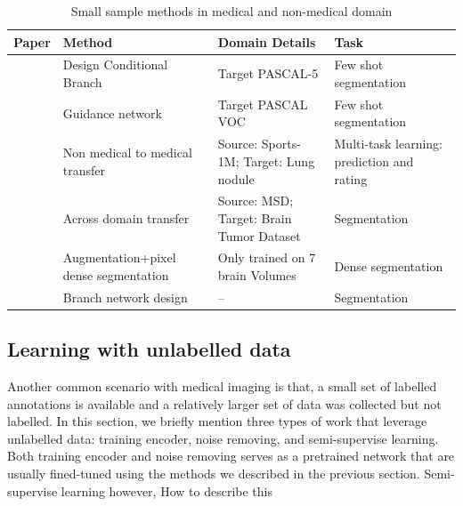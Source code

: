 \begin{table}
\begin{tabular}{p{1cm} p{5cm} p{4cm} p{4cm}}
\hline
Paper    & Method                                & Domain Details                                          & Task                                       \\
\hline
{\cite{shaban_one-shot_2017}} & Design Conditional Branch             & Target PASCAL-5        & Few shot segmentation                      \\
{\cite{rakelly_few-shot_nodate}} & Guidance network                      & Target PASCAL VOC             & Few shot segmentation                      \\
{\cite{hussein_risk_2017}} & Non medical to medical transfer       & Source: Sports-1M;  Target: Lung nodule                  & Multi-task learning: prediction and rating \\
{\cite{wang_improving_2019}} & Across domain transfer                & Source: MSD; Target: Brain Tumor Dataset & Segmentation                               \\
{\cite{shaban_one-shot_2017}} & Augmentation+pixel dense segmentation & Only trained on 7 brain Volumes                         & Dense segmentation                         \\
{\cite{suk_brain_2019}}  & Branch network design                 & --                                                      & Segmentation                               \\
\hline
\end{tabular}
\caption{Small sample methods in medical and non-medical domain}
\label{tab:small sample learning}
\end{table}	

\subsection{Learning with unlabelled data}
Another common scenario with medical imaging is that, a small set of labelled annotations is available and a relatively larger set of data was collected but not labelled. In this section, we briefly mention three types of work that leverage unlabelled data: training encoder, noise removing, and semi-supervise learning. Both training encoder and noise removing serves as a pretrained network that are usually fined-tuned using the methods we described in the previous section. Semi-supervise learning however, {\color{red} How to describe this}

